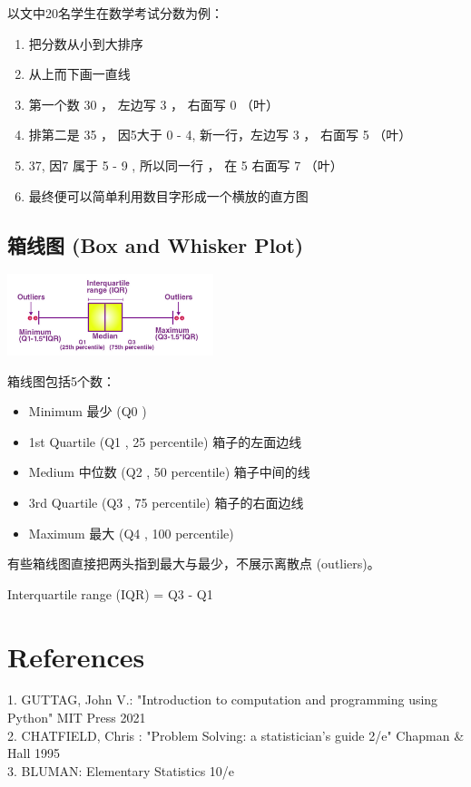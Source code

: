 以文中20名学生在数学考试分数为例：

\begin{enumerate}
\tightlist
\item
  把分数从小到大排序
\item
  从上而下画一直线
\item
  第一个数 30 ， 左边写 3 ， 右面写 0 （叶）
\item
  排第二是 35 ， 因5大于 0 - 4, 新一行，左边写 3 ， 右面写 5 （叶）
\item
  37, 因7 属于 5 - 9 , 所以同一行 ， 在 5 右面写 7 （叶）
\item
  最终便可以简单利用数目字形成一个横放的直方图
\end{enumerate}

\hypertarget{ux7bb1ux7ebfux56fe-box-and-whisker-plot}{%
\subsection{箱线图 (Box and Whisker
Plot)}\label{ux7bb1ux7ebfux56fe-box-and-whisker-plot}}

\includegraphics[width=6cm]{BoxWhiskerScreenshot_2021-08-02_214603.png}

箱线图包括5个数：

\begin{itemize}
\tightlist
\item
  Minimum 最少 (Q0 )
\item
  1st Quartile (Q1 , 25 percentile) 箱子的左面边线
\item
  Medium 中位数 (Q2 , 50 percentile) 箱子中间的线
\item
  3rd Quartile (Q3 , 75 percentile) 箱子的右面边线
\item
  Maximum 最大 (Q4 , 100 percentile)
\end{itemize}

有些箱线图直接把两头指到最大与最少，不展示离散点 (outliers)。

Interquartile range (IQR) = Q3 - Q1


\hypertarget{references}{%
\section{References}\label{references}}

1. GUTTAG, John V.: "Introduction to computation and programming using
Python" MIT Press 2021\\
2. CHATFIELD, Chris : "Problem Solving: a statistician's guide 2/e"
Chapman \& Hall 1995\\
3. BLUMAN: Elementary Statistics 10/e\\




